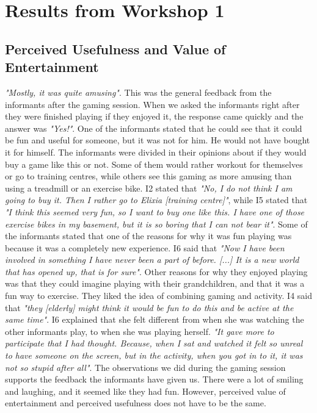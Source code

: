 \chapter{Results from Workshop 1}

\section{Perceived Usefulness and Value of Entertainment}
\emph{"Mostly, it was quite amusing"}. This was the general feedback from the informants after the gaming session. When we asked the informants right after they were finished playing if they enjoyed it, the response came quickly and the answer was \emph{"Yes!"}. One of the informants stated that he could see that it could be fun and useful for someone, but it was not for him. He would not have bought it for himself. The informants were divided in their opinions about if they would buy a game like this or not. Some of them would rather workout for themselves or go to training centres, while others see this gaming as more amusing than using a treadmill or an exercise bike. I2 stated that \emph{"No, I do not think I am going to buy it. Then I rather go to Elixia [training centre]"}, while I5 stated that \emph{"I think this seemed very fun, so I want to buy one like this. I have one of those exercise bikes in my basement, but it is so boring that I can not bear it"}.  Some of the informants stated that one of the reasons for why it was fun playing was because it was a completely new experience. I6 said that \emph{"Now I have been involved in something I have never been a part of before. [...] It is a new world that has opened up, that is for sure"}. Other reasons for why they enjoyed playing was that they could imagine playing with their grandchildren, and that it was a fun way to exercise. They liked the idea of combining gaming and activity. I4 said that \emph{"they [elderly] might think it would be fun to do this and be active at the same time"}. I6 explained that she felt different from when she was watching the other informants play, to when she was playing herself. \emph{"It gave more to participate that I had thought. Because, when I sat and watched it felt so unreal to have someone on the screen, but in the activity, when you got in to it, it was not so stupid after all"}. The observations we did during the gaming session supports the feedback the informants have given us. There were a lot of smiling and laughing, and it seemed like they had fun. However, perceived value of entertainment and perceived usefulness does not have to be the same. 

